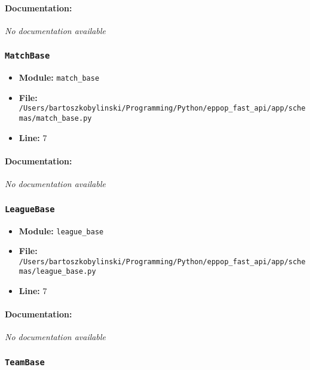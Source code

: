 \documentclass[11pt,a4paper]{article}
\begin{document}
\paragraph{Documentation:} \textit{No documentation available}


\vspace{1em}
\subsubsection{\texttt{MatchBase}}

\begin{itemize}
    \item \textbf{Module:} \texttt{match\_base}
    \item \textbf{File:} \texttt{/Users/bartoszkobylinski/Programming/Python/eppop\_fast\_api/app/schemas/match\_base.py}
    \item \textbf{Line:} 7
\end{itemize}

\paragraph{Documentation:} \textit{No documentation available}


\vspace{1em}
\subsubsection{\texttt{LeagueBase}}

\begin{itemize}
    \item \textbf{Module:} \texttt{league\_base}
    \item \textbf{File:} \texttt{/Users/bartoszkobylinski/Programming/Python/eppop\_fast\_api/app/schemas/league\_base.py}
    \item \textbf{Line:} 7
\end{itemize}

\paragraph{Documentation:} \textit{No documentation available}


\vspace{1em}
\subsubsection{\texttt{TeamBase}}
\end{document}
